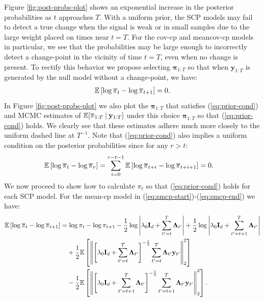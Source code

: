 Figure \ref{fig:post-probs-plot} shows an exponential increase in the posterior probabilities as $t$ approaches $T$. With a uniform prior, the SCP models may fail to detect a true change when the signal is weak or in small samples due to the large weight placed on times near $t = T$. For the cov-cp and meancov-cp models in particular, we see that the probabilities may be large enough to incorrectly detect a change-point in the vicinity of time $t=T$, even when no change is present. To rectify this behavior we propose selecting $\boldsymbol{\pi}_{1:T}$ so that when $\mathbf{y}_{1:T}$ is generated by the null model without a change-point, we have:
\begin{align}\label{eq:prior-cond}
    \mathbb{E}\left[\log\overline{\pi}_t - \log \overline{\pi}_{t+1} \right] = 0.
\end{align}
In Figure \ref{fig:post-probs-plot} we also plot the $\boldsymbol{\pi}_{1:T}$ that satisfies (\ref{eq:prior-cond}) and MCMC estimates of $\mathbb{E}[\overline{\pi}_{1:T} \:|\: \mathbf{y}_{1:T}]$ under this choice $\boldsymbol{\pi}_{1:T}$ so that (\ref{eq:prior-cond}) holds. We clearly see that these estimates adhere much more closely to the uniform dashed line at $T^{-1}$. Note that (\ref{eq:prior-cond}) also implies a uniform condition on the posterior probabilities since for any $r > t$:
\begin{align*}
    \mathbb{E}\left[\log\overline{\pi}_t - \log \overline{\pi}_r \right] &= \sum_{i=0}^{r-t-1} \mathbb{E}\left[\log\overline{\pi}_{t+i} - \log \overline{\pi}_{t+i+1} \right] = 0.
\end{align*}
We now proceed to show how to calculate $\pi_t$ so that (\ref{eq:prior-cond}) holds for each SCP model. For the mean-cp model in (\ref{eq:smcp-start})-(\ref{eq:smcp-end}) we have:
\small
\begin{align*}
    \mathbb{E}\left[\log\overline{\pi}_t - \log \overline{\pi}_{t+1} \right] &= \log \pi_t - \log \pi_{t+1} - \frac{1}{2} \log \left|\lambda_0\mathbf{I}_d + \sum_{t'=t}^{T} \boldsymbol{\Lambda}_{t'}\right| + \frac{1}{2} \log \left|\lambda_0\mathbf{I}_d + \sum_{t'=t+1}^{T} \boldsymbol{\Lambda}_{t'}\right|\\
    &\quad + \frac{1}{2} \mathbb{E}\left[\left\lVert \left[\lambda_0\mathbf{I}_d + \sum_{t'=t}^{T} \boldsymbol{\Lambda}_{t'}\right]^{-\frac{1}{2}} \sum_{t'=t}^{T} \boldsymbol{\Lambda}_{t'} \mathbf{y}_{t'}\right\rVert_2^2 \right]\\
    &\quad- \frac{1}{2} \mathbb{E}\left[\left\lVert \left[\lambda_0\mathbf{I}_d + \sum_{t'=t+1}^{T} \boldsymbol{\Lambda}_{t'}\right]^{-\frac{1}{2}} \sum_{t'=t+1}^{T} \boldsymbol{\Lambda}_{t'} \mathbf{y}_{t'}\right\rVert_2^2 \right].
\end{align*}
